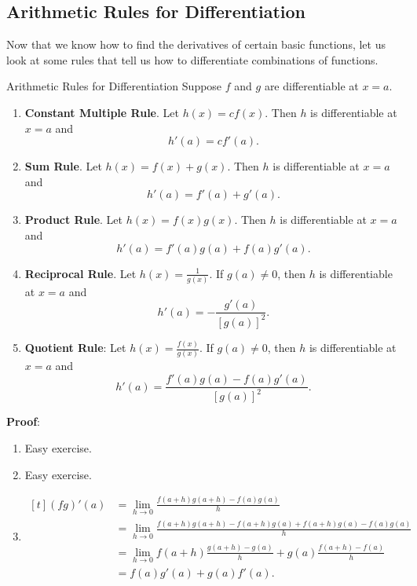 \subsection{Arithmetic Rules for Differentiation}
Now that we know how to find the derivatives of certain basic functions,
let us look at some rules that tell us how to differentiate combinations
of functions.
\begin{Theorem}{Arithmetic Rules for Differentiation}{}
    Suppose $ f $ and $ g $ are differentiable at $ x=a $.
    \begin{enumerate}[(1)]
        \item \textbf{Constant Multiple Rule}. Let $ h(x)=cf(x) $. Then $ h $ is differentiable at $ x=a $ and
              \[ h'(a)=c f'(a). \]
        \item \textbf{Sum Rule}. Let $ h(x)=f(x)+g(x) $. Then $ h $ is differentiable at $ x=a $ and
              \[ h'(a)=f'(a)+g'(a). \]
        \item \textbf{Product Rule}. Let $ h(x)=f(x)g(x) $. Then $ h $ is differentiable at $ x=a $ and
              \[ h'(a)=f'(a)g(a)+f(a)g'(a). \]
        \item \textbf{Reciprocal Rule}. Let $ h(x)=\frac{1}{g(x)} $. If $ g(a)\ne 0 $, then $ h $ is differentiable at $ x=a $ and
              \[ h'(a)=-\frac{g'(a)}{[g(a)]^2}. \]
        \item \textbf{Quotient Rule}: Let $ h(x)=\frac{f(x)}{g(x)} $. If $ g(a)\ne 0 $, then $ h $ is differentiable at $ x=a $ and
              \[ h'(a)=\frac{f'(a)g(a)-f(a)g'(a)}{[g(a)]^2}. \]
    \end{enumerate}
    \tcblower{}
    \textbf{Proof}:
    \begin{enumerate}[(1)]
        \item Easy exercise.
        \item Easy exercise.
        \item $ \begin{aligned}[t]
                      (fg)'(a)
                       & =\lim\limits_{{h} \to {0}}\frac{f(a+h)g(a+h)-f(a)g(a)}{h}                        \\
                       & =\lim\limits_{{h} \to {0}}\frac{f(a+h)g(a+h)-f(a+h)g(a)+f(a+h)g(a)-f(a)g(a)}{h}  \\
                       & =\lim\limits_{{h} \to {0}}f(a+h)\frac{g(a+h)-g(a)}{h}+g(a) \frac{f(a+h)-f(a)}{h} \\
                       & =f(a)g'(a)+g(a)f'(a).
                  \end{aligned} $

\end{enumerate}
\end{Theorem}
